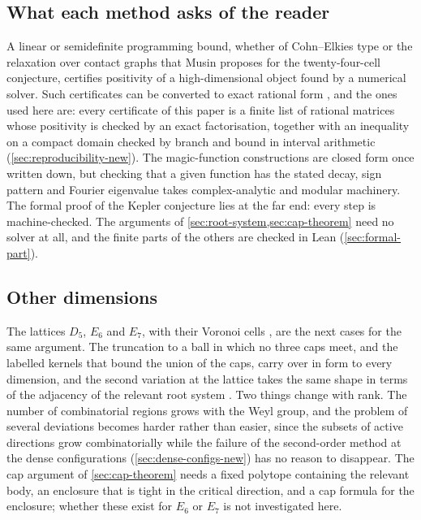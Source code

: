 \documentclass[11pt,reqno]{amsart}
\renewcommand{\_}{\origunderscore\allowbreak}
\numberwithin{equation}{section}
\theoremstyle{plain}
\theoremstyle{definition}
\theoremstyle{remark}
\begin{document}
\subsection{What each method asks of the reader}

A linear or semidefinite programming bound, whether of Cohn--Elkies type
or the relaxation over contact graphs that Musin \cite{Mus18} proposes for
the twenty-four-cell conjecture, certifies positivity of a
high-dimensional object found by a numerical solver. Such certificates can
be converted to exact rational form \cite{Par03,Las01,CdLL24}, and the ones
used here are: every certificate of this paper is a finite list of rational
matrices whose positivity is checked by an exact factorisation, together with
an inequality on a compact domain checked by branch and bound in interval
arithmetic (\cref{sec:reproducibility-new}). The magic-function constructions
are closed form once written down, but checking that a given function has the
stated decay, sign pattern and Fourier eigenvalue takes complex-analytic and
modular machinery. The formal proof of the Kepler conjecture \cite{Hal17}
lies at the far end: every step is machine-checked. The arguments of
\cref{sec:root-system,sec:cap-theorem} need no solver at all, and the finite
parts of the others are checked in Lean (\cref{sec:formal-part}).

\subsection{Other dimensions}\label{sec:other-dims-new}

The lattices $D_5$, $E_6$ and $E_7$, with their Voronoi cells
\cite{CS1988,Cox73}, are the next cases for the same argument.
The truncation to a ball in which no three caps meet, and the labelled
kernels that bound the union of the caps, carry over in form to every
dimension, and the second variation at the lattice takes the same shape in
terms of the adjacency of the relevant root system \cite{Hum90}. Two things
change with rank. The number of combinatorial regions grows with the Weyl
group, and the problem of several deviations becomes harder rather than
easier, since the subsets of active directions grow combinatorially while
the failure of the second-order method at the dense configurations
(\cref{sec:dense-configs-new}) has no reason to disappear. The cap argument of \cref{sec:cap-theorem} needs a fixed polytope
containing the relevant body, an enclosure that is tight in the critical
direction, and a cap formula for the enclosure; whether these exist for
$E_6$ or $E_7$ is not investigated here.
\end{document}
